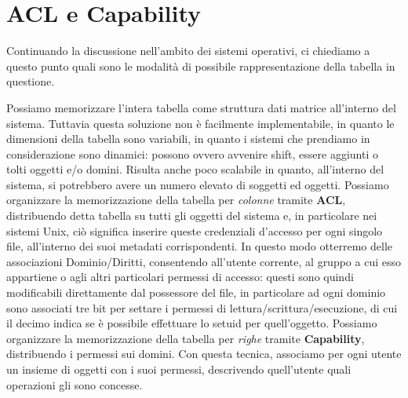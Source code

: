 \section{ACL e Capability}
Continuando la discussione nell'ambito dei sistemi operativi, ci chiediamo a 
questo punto quali sono le modalità di possibile rappresentazione della tabella
in questione. 
\begin{itemize}
\diam Possiamo memorizzare l'intera tabella come struttura dati matrice all'interno
	del sistema. Tuttavia questa soluzione non è facilmente implementabile,
	in quanto le dimensioni della tabella sono variabili, in quanto i sistemi
	che prendiamo in considerazione sono dinamici: possono ovvero avvenire
	shift, essere aggiunti o tolti oggetti e/o domini. Risulta anche poco
	scalabile in quanto, all'interno del sistema, si potrebbero avere un 
	numero elevato di soggetti ed oggetti.
\diam Possiamo organizzare la memorizzazione della tabella per \textit{colonne} 
	tramite \textbf{ACL}, distribuendo detta tabella su tutti gli oggetti del
	sistema e, in particolare nei sistemi Unix, ciò significa inserire
	queste credenziali d'accesso per ogni singolo file, all'interno dei suoi
	metadati corrispondenti. In questo modo otterremo delle associazioni 
	Dominio/Diritti, consentendo all'utente corrente, al gruppo a cui esso
	appartiene o agli altri particolari permessi di accesso: questi sono
	quindi modificabili direttamente dal possessore del file, in 
	particolare ad ogni dominio sono associati tre bit per settare i permessi
	di lettura/scrittura/esecuzione, di cui il decimo indica se è possibile
	effettuare lo setuid per quell'oggetto. 
\diam Possiamo organizzare la memorizzazione della tabella per \textit{righe} tramite
	\textbf{Capability}, distribuendo i permessi sui domini. Con questa tecnica,
	associamo per ogni utente un insieme di oggetti con i suoi permessi, 
	descrivendo quell'utente quali operazioni gli sono concesse.
\end{itemize}

